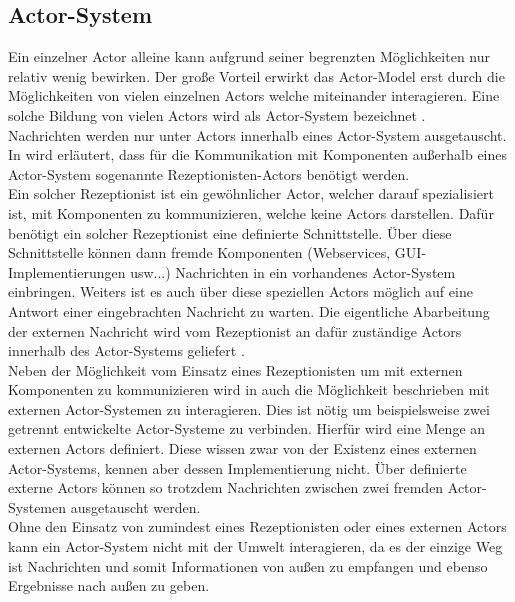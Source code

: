 \subsection{Actor-System}\label{actor:actorSystem}
Ein einzelner Actor alleine kann aufgrund seiner begrenzten Möglichkeiten nur relativ wenig bewirken. Der große Vorteil erwirkt das Actor-Model erst durch die Möglichkeiten von vielen einzelnen Actors welche miteinander interagieren. Eine solche Bildung von vielen Actors wird als Actor-System bezeichnet \citep{Agha1985ActorsSystems}.\\
Nachrichten werden nur unter Actors innerhalb eines Actor-System ausgetauscht. In \cite{Agha1985ActorsSystems} wird erläutert, dass für die Kommunikation mit Komponenten außerhalb eines Actor-System sogenannte Rezeptionisten-Actors benötigt werden.\\
Ein solcher Rezeptionist ist ein gewöhnlicher Actor, welcher darauf spezialisiert ist, mit Komponenten zu kommunizieren, welche keine Actors darstellen. Dafür benötigt ein solcher Rezeptionist eine definierte Schnittstelle. Über diese Schnittstelle können dann fremde Komponenten (Webservices, GUI-Implementierungen usw...) Nachrichten in ein vorhandenes Actor-System einbringen. Weiters ist es auch über diese speziellen Actors möglich auf eine Antwort einer eingebrachten Nachricht zu warten. Die eigentliche Abarbeitung der externen Nachricht wird vom Rezeptionist an dafür zuständige Actors innerhalb des Actor-Systems geliefert \citep{Agha1985ActorsSystems}.\\
Neben der Möglichkeit vom Einsatz eines Rezeptionisten um mit externen Komponenten zu kommunizieren wird in \cite{Agha1985ActorsSystems} auch die Möglichkeit beschrieben mit externen Actor-Systemen zu interagieren. Dies ist nötig um beispielsweise zwei getrennt entwickelte Actor-Systeme zu verbinden. Hierfür wird eine Menge an externen Actors definiert. Diese wissen zwar von der Existenz eines externen Actor-Systems, kennen aber dessen Implementierung nicht. Über definierte externe Actors können so trotzdem Nachrichten zwischen zwei fremden Actor-Systemen ausgetauscht werden. \\
Ohne den Einsatz von zumindest eines Rezeptionisten oder eines externen Actors kann ein Actor-System nicht mit der Umwelt interagieren, da es der einzige Weg ist Nachrichten und somit Informationen von außen zu empfangen und ebenso Ergebnisse nach außen zu geben. 







